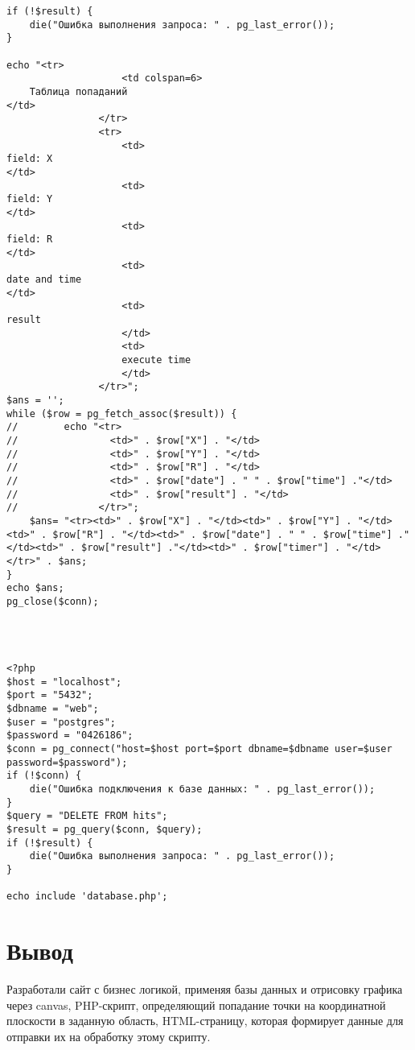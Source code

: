 \documentclass{article}
\begin{document}
\begin{verbatim}
if (!$result) {
    die("Ошибка выполнения запроса: " . pg_last_error());
}

echo "<tr>
                    <td colspan=6>
    Таблица попаданий
</td>
                </tr>
                <tr>
                    <td>
field: X
</td>
                    <td>
field: Y
</td>
                    <td>
field: R
</td>
                    <td>
date and time
</td>
                    <td>
result
                    </td>
                    <td>
                    execute time
                    </td>
                </tr>";
$ans = '';
while ($row = pg_fetch_assoc($result)) {
//        echo "<tr>
//                <td>" . $row["X"] . "</td>
//                <td>" . $row["Y"] . "</td>
//                <td>" . $row["R"] . "</td>
//                <td>" . $row["date"] . " " . $row["time"] ."</td>
//                <td>" . $row["result"] . "</td>
//              </tr>";
    $ans= "<tr><td>" . $row["X"] . "</td><td>" . $row["Y"] . "</td><td>" . $row["R"] . "</td><td>" . $row["date"] . " " . $row["time"] ."</td><td>" . $row["result"] ."</td><td>" . $row["timer"] . "</td></tr>" . $ans;
}
echo $ans;
pg_close($conn);




<?php
$host = "localhost";
$port = "5432";
$dbname = "web";
$user = "postgres";
$password = "0426186";
$conn = pg_connect("host=$host port=$port dbname=$dbname user=$user password=$password");
if (!$conn) {
    die("Ошибка подключения к базе данных: " . pg_last_error());
}
$query = "DELETE FROM hits";
$result = pg_query($conn, $query);
if (!$result) {
    die("Ошибка выполнения запроса: " . pg_last_error());
}

echo include 'database.php';
\end{verbatim}
\section{Вывод}
Разработали сайт с бизнес логикой, применяя базы данных и отрисовку графика через canvas, PHP-скрипт, определяющий попадание точки на координатной плоскости в заданную область, HTML-страницу, которая формирует данные для отправки их на обработку этому скрипту.
\end{document}
